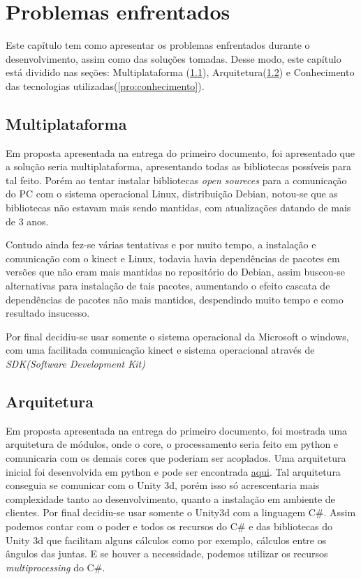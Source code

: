 \chapter[Problemas enfrentados]{Problemas enfrentados}\label{ch:problemas}
  Este capítulo tem como apresentar os problemas enfrentados durante o desenvolvimento,
  assim como das soluções tomadas. Desse modo, este
capítulo está dividido nas seções: Multiplataforma (\ref{pro:Multiplataforma}),
Arquitetura(\ref{pro:arquitetura}) e Conhecimento das tecnologias utilizadas(\ref{pro:conhecimento}).
\section{Multiplataforma}\label{pro:Multiplataforma}
  Em proposta apresentada na entrega do primeiro documento, foi apresentado que a solução seria multiplataforma,
apresentando todas as bibliotecas possíveis para tal feito. Porém ao tentar instalar bibliotecas \textit{open soureces}
para a comunicação do PC com o sistema operacional Linux, distribuição Debian, notou-se que as bibliotecas não
estavam mais sendo mantidas, com atualizações datando de mais de 3 anos.

  Contudo ainda fez-se várias tentativas e por muito tempo,
a instalação e comunicação com o kinect e Linux, todavia havia dependências de pacotes em versões que não eram mais
mantidas no repositório do Debian, assim buscou-se alternativas para instalação de tais pacotes, aumentando o efeito cascata
de dependências de pacotes não mais mantidos, despendindo muito tempo e como resultado insucesso.

  Por final decidiu-se usar somente o sistema operacional da Microsoft o windows, com uma facilitada comunicação
kinect e sistema operacional através de \textit{SDK(Software Development Kit)}


\section{Arquitetura}\label{pro:arquitetura}
  Em proposta apresentada na entrega do primeiro documento, foi mostrada uma arquitetura de módulos, onde o core,
o processamento seria feito em python e comunicaria com os demais cores que poderiam ser acoplados. Uma arquitetura
inicial foi desenvolvida em python e pode ser encontrada \href{https://gitlab.com/ricardogtx/tcc2}{aqui}. Tal arquitetura conseguia
se comunicar com o Unity 3d, porém isso só acrescentaria mais complexidade tanto ao desenvolvimento, quanto a
instalação em ambiente de clientes.
  Por final decidiu-se usar somente o Unity3d com a linguagem C\#. Assim podemos contar com o poder e todos os recursos do C\#
 e das bibliotecas do Unity 3d que facilitam alguns cálculos como por exemplo,
 cálculos entre os ângulos das juntas. E se houver a necessidade, podemos utilizar os recursos
\textit{multiprocessing} do C\#.

